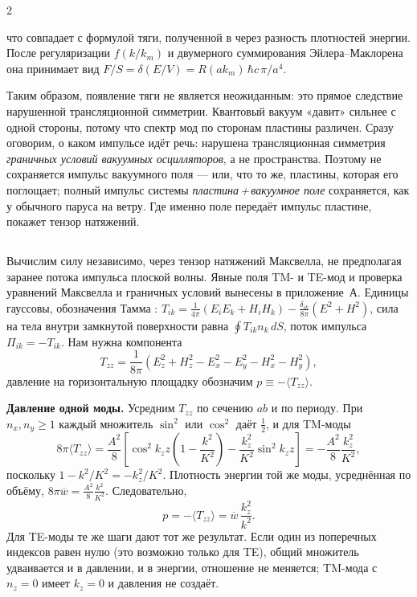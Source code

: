 \documentclass[twoside, 10pt]{article}
\def\myvspacebeforesubsection{-2.0mm}
\def\myvspaceaftersubsection{-2.5mm}
\begin{document}
\begin{multicols}{2}

что совпадает с формулой тяги, полученной в \cite{Drozdov2024} через разность плотностей энергии.
После регуляризации \(f(k/k_m)\) и двумерного суммирования Эйлера--Маклорена она принимает вид
\(F/S=\delta(E/V)=R(ak_m)\,\hbar c\,\pi/a^4\).

Таким образом, появление тяги не является неожиданным: это прямое следствие нарушенной
трансляционной симметрии. Квантовый вакуум «давит» сильнее с одной стороны, потому что спектр
мод по сторонам пластины различен. Сразу оговорим, о каком импульсе идёт речь: нарушена
трансляционная симметрия \emph{граничных условий вакуумных осцилляторов}, а не пространства. Поэтому не сохраняется
импульс вакуумного поля --- или, что то же, пластины, которая его поглощает; полный импульс системы
\emph{пластина\,+\,вакуумное поле} сохраняется, как у обычного паруса на ветру. Где именно
поле передаёт импульс пластине, покажет тензор натяжений.

\vspace{\myvspacebeforesubsection}
\subsection*{}
\vspace{\myvspaceaftersubsection}


Вычислим силу независимо, через тензор натяжений Максвелла, не предполагая заранее потока
импульса плоской волны. Явные поля TM- и TE-мод и проверка уравнений Максвелла и граничных
условий вынесены в приложение~А. Единицы гауссовы, обозначения Тамма \cite{Tamm1957}:
\(T_{ik}=\frac1{4\pi}(E_iE_k+H_iH_k)-\frac{\delta_{ik}}{8\pi}(E^2+H^2)\), сила на тела внутри
замкнутой поверхности равна \(\oint T_{ik}n_k\,dS\), поток импульса \(\Pi_{ik}=-T_{ik}\). Нам нужна
компонента
\[
T_{zz}=\frac1{8\pi}\left(E_z^2+H_z^2-E_x^2-E_y^2-H_x^2-H_y^2\right),
\]
давление на горизонтальную площадку обозначим \(p\equiv-\langle T_{zz}\rangle\).

\textbf{Давление одной моды.} Усредним \(T_{zz}\) по сечению \(ab\) и по периоду. При
\(n_x,n_y\ge1\) каждый множитель \(\sin^2\) или \(\cos^2\) даёт \(\tfrac12\), и для TM-моды
\[
8\pi\langle T_{zz}\rangle=\frac{A^2}{8}\left[\cos^2k_zz\left(1-\frac{k^2}{K^2}\right)-\frac{k_z^2}{K^2}\sin^2k_zz\right]
=-\frac{A^2}{8}\frac{k_z^2}{K^2},
\]
поскольку \(1-k^2/K^2=-k_z^2/K^2\). Плотность энергии той же моды, усреднённая по объёму,
\(8\pi\overline w=\frac{A^2}{8}\frac{k^2}{K^2}\). Следовательно,
\[
p=-\langle T_{zz}\rangle=\overline w\,\frac{k_z^2}{k^2}.
\]
Для TE-моды те же шаги дают тот же результат. Если один из поперечных индексов равен нулю (это
возможно только для TE), общий множитель удваивается и в давлении, и в энергии, отношение не
меняется; TM-мода с \(n_z=0\) имеет \(k_z=0\) и давления не создаёт.


\end{multicols}
\end{document}
